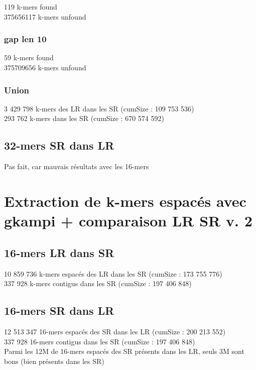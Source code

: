 \documentclass[12pt]{article}
\begin{document}
119 k-mers found \\
375656117 k-mers unfound

\subsubsection{gap len 10}

59 k-mers found \\
375709656 k-mers unfound

\subsubsection{Union}

3 429 798 k-mers des LR dans les SR (cumSize : 109 753 536) \\
 293 762 k-mers dans les SR (cumSize : 670 574 592)

\subsection{32-mers SR dans LR}

Pas fait, car mauvais résultats avec les 16-mers

\section{Extraction de k-mers espacés avec gkampi + comparaison LR SR v. 2}

\subsection{16-mers LR dans SR}

10 859 736 k-mers espacés des LR dans les SR (cumSize : 173 755 776)\\
 337 928 k-mers contigus dans les SR (cumSize : 197 406 848)

\subsection{16-mers SR dans LR}

12 513 347 16-mers espacés des SR dans les LR (cumSize : 200 213 552) \\
 337 928 16-mers contigus dans les SR (cumSize : 197 406 848) \\

Parmi les 12M de 16-mers espacés des SR présents dans les LR, seuls 3M sont bons (bien présents dans les SR)
\end{document}
